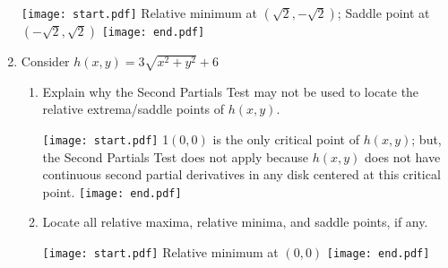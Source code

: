 \documentclass[12pt]{article}
\begin{document}
\begin{enumerate}
\texttt{[image: start.pdf]}
{{Relative minimum at $\left(\sqrt{2},-\sqrt{2}\right)$; Saddle point at $\left(-\sqrt{2},\sqrt{2}\right)$}}
\texttt{[image: end.pdf]}


\item Consider $h(x,y)=3\sqrt{x^2+y^2}+6$

\begin{enumerate}

\item Explain why the Second Partials Test may not be used to locate the relative extrema/saddle points of $h(x,y)$.  

\texttt{[image: start.pdf]}
{{{1\linewidth}{$(0,0)$ is the only critical point of $h(x,y)$; but, the Second Partials Test does not apply because $h(x,y)$ does not have continuous second partial derivatives in any disk centered at this critical point.}}}
\texttt{[image: end.pdf]}


\item Locate all relative maxima, relative minima, and saddle points, if any.

\texttt{[image: start.pdf]}
{{Relative minimum at $(0,0)$}}
\texttt{[image: end.pdf]}


\end{enumerate}

\end{enumerate}

\end{document}
